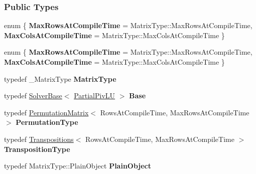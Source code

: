 \subsubsection*{Public Types}
\begin{DoxyCompactItemize}
\item 
\mbox{\label{group___l_u___module_a7e82d763621d77392a0c5e0d3bed6296}} 
enum \{ {\bfseries Max\+Rows\+At\+Compile\+Time} = Matrix\+Type\+:\+:Max\+Rows\+At\+Compile\+Time, 
{\bfseries Max\+Cols\+At\+Compile\+Time} = Matrix\+Type\+:\+:Max\+Cols\+At\+Compile\+Time
 \}
\item 
\mbox{\label{group___l_u___module_ac6000e43f081ef6bd3664242d504e0bd}} 
enum \{ {\bfseries Max\+Rows\+At\+Compile\+Time} = Matrix\+Type\+:\+:Max\+Rows\+At\+Compile\+Time, 
{\bfseries Max\+Cols\+At\+Compile\+Time} = Matrix\+Type\+:\+:Max\+Cols\+At\+Compile\+Time
 \}
\item 
\mbox{\label{group___l_u___module_a0736a02bea471dbed733a1fb2cebb678}} 
typedef \+\_\+\+Matrix\+Type {\bfseries Matrix\+Type}
\item 
\mbox{\label{group___l_u___module_a2131c6ccbf78c1dcfe862654beed1272}} 
typedef \hyperlink{class_eigen_1_1_solver_base}{Solver\+Base}$<$ \hyperlink{group___l_u___module_class_eigen_1_1_partial_piv_l_u}{Partial\+Piv\+LU} $>$ {\bfseries Base}
\item 
\mbox{\label{group___l_u___module_a5b5f010f3e7acdff7b7c72db874dc3d9}} 
typedef \hyperlink{group___core___module_class_eigen_1_1_permutation_matrix}{Permutation\+Matrix}$<$ Rows\+At\+Compile\+Time, Max\+Rows\+At\+Compile\+Time $>$ {\bfseries Permutation\+Type}
\item 
\mbox{\label{group___l_u___module_acf0c9c89566e8aba4fae8f470c5a8d4a}} 
typedef \hyperlink{group___core___module_class_eigen_1_1_transpositions}{Transpositions}$<$ Rows\+At\+Compile\+Time, Max\+Rows\+At\+Compile\+Time $>$ {\bfseries Transposition\+Type}
\item 
\mbox{\label{group___l_u___module_aaae954615fa4a1dd947fe7d380bf7206}} 
typedef Matrix\+Type\+::\+Plain\+Object {\bfseries Plain\+Object}

\end{DoxyCompactItemize}
